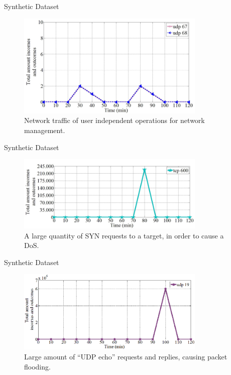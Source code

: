 \documentclass[newPxFont, numfooter, sectionpages]{beamer}
\begin{document}
\begin{frame}[c]{Synthetic Dataset}
	
	\begin{figure}[h!]
	     \centering 
	     \includegraphics[width=9cm]{../figures/fig04.png}
	     \caption{Network traffic of user independent operations for network management.}
	     \label{fig:2_fig4}
	\end{figure}

\end{frame}
\begin{frame}[c]{Synthetic Dataset}
	
	\begin{figure}[h!]
	     \centering 
	     \includegraphics[width=9cm]{../figures/fig05.png}
	     \caption{A large quantity of SYN requests to a target, in order to cause a DoS.}
	     \label{fig:2_fig5}
	\end{figure}

\end{frame}
\begin{frame}[c]{Synthetic Dataset}
	
	\begin{figure}[h!]
	     \centering 
	     \includegraphics[width=9cm]{../figures/fig06.png}
	     \caption{Large amount of “UDP echo” requests and replies, causing packet flooding.}
	     \label{fig:2_fig6}
	\end{figure}

\end{frame}
\end{document}
